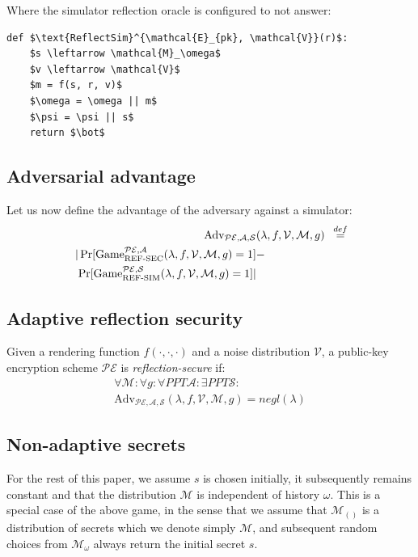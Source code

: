 \documentclass[conference, letterpaper, 10pt]{IEEEtran}
\newcommand\defeq{\stackrel{\mathclap{\normalfont\mbox{def}}}{=}}
\begin{document}
Where the simulator reflection oracle is configured to not answer:

\begin{lstlisting}[texcl,mathescape,basicstyle=\small]
def $\text{ReflectSim}^{\mathcal{E}_{pk}, \mathcal{V}}(r)$:
    $s \leftarrow \mathcal{M}_\omega$
    $v \leftarrow \mathcal{V}$
    $m = f(s, r, v)$
    $\omega = \omega || m$
    $\psi = \psi || s$
    return $\bot$
\end{lstlisting}

\subsection{Adversarial advantage}\label{subsec:refsecadv}

Let us now define the advantage of the adversary against a simulator:
\begin{align*}
    \text{Adv}_{\mathcal{PE}, \mathcal{A}, \mathcal{S}}&(\lambda, f, \mathcal{V}, \mathcal{M}, g) &\defeq\\
    |\Pr[\text{Game}_{\text{REF-SEC}}^{\mathcal{PE},\mathcal{A}}(\lambda, f, \mathcal{V}, \mathcal{M}, g) = 1] &-\\
    \Pr[\text{Game}_{\text{REF-SIM}}^{\mathcal{PE},\mathcal{S}}(\lambda, f, \mathcal{V}, \mathcal{M}, g) = 1]| &
\end{align*}

\subsection{Adaptive reflection security}\label{subsec:adaptiverefsec}

Given a rendering function $f(\cdot, \cdot, \cdot)$ and
a noise distribution $\mathcal{V}$, a public-key encryption scheme
$\mathcal{PE}$ is \textit{reflection-secure} if:
\begin{align*}
\forall \mathcal{M}:
\forall g:
\forall PPT \mathcal{A}:
\exists PPT \mathcal{S}:\\
\text{Adv}_{\mathcal{PE}, \mathcal{A}, \mathcal{S}}(\lambda, f, \mathcal{V}, \mathcal{M}, g) = negl(\lambda)
\end{align*}

\subsection{Non-adaptive secrets}\label{subsec:refsecnonadapt}

For the rest of this paper, we assume $s$ is chosen initially, it subsequently
remains constant and that the distribution $\mathcal{M}$ is independent of
history $\omega$. This is a special case of the above game, in the sense that we
assume that $\mathcal{M}_{()}$ is a distribution of secrets which we denote
simply $\mathcal{M}$, and subsequent random choices from $\mathcal{M}_\omega$
always return the initial secret $s$.
\end{document}
